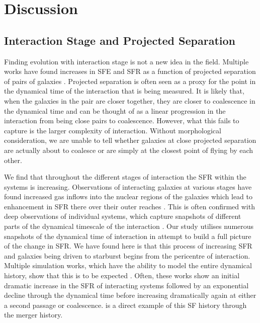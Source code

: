 \section{Discussion}\label{discussion}
\subsection{Interaction Stage and Projected Separation}
\noindent Finding evolution with interaction stage is not a new idea in the field. Multiple works have found increases in SFE and SFR as a function of projected separation of pairs of galaxies \citep{2000ApJ...530..660B, 2008AJ....135.1877E, 2013MNRAS.433L..59P}. Projected separation is often seen as a proxy for the point in the dynamical time of the interaction that is being measured. It is likely that, when the galaxies in the pair are closer together, they are closer to coalescence in the dynamical time and can be thought of as a linear progression in the interaction from being close pairs to coalescence. However, what this fails to capture is the larger complexity of interaction. Without morphological consideration, we are unable to tell whether galaxies at close projected separation are actually about to coalesce or are simply at the closest point of flying by each other.

We find that throughout the different stages of interaction the SFR within the systems is increasing. Observations of interacting galaxies at various stages have found increased gas inflows into the nuclear regions of the galaxies which lead to enhancement in SFR there over their outer reaches \citep{2015A&A...579A..45B}. This is often confirmed with deep observations of individual systems, which capture snapshots of different parts of the dynamical timescale of the interaction \citep{2022MNRAS.514.2769K}. Our study utilises numerous snapshots of the dynamical time of interaction in attempt to build a full picture of the change in SFR. We have found here is that this process of increasing SFR and galaxies being driven to starburst begins from the pericentre of interaction. Multiple simulation works, which have the ability to model the entire dynamical history, show that this is to be expected \citep{2007A&A...468...61D, 2013MNRAS.430.1901H, 2015MNRAS.452.2984K, 2021MNRAS.503.3113M}. Often, these works show an initial dramatic increase in the SFR of interacting systems followed by an exponential decline through the dynamical time before increasing dramatically again at either a second passage or coalescence. \citet{2015MNRAS.448.1107M} is a direct example of this SF history through the merger history.

